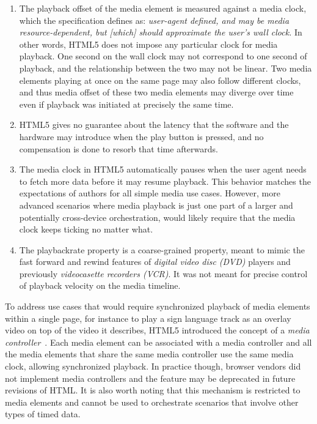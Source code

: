 \begin{enumerate}

\item{

The playback offset of the media element is measured against a media clock,
which the specification defines as: \emph{user-agent defined, and may be media
resource-dependent, but [which] should approximate the user's wall clock.} In
other words, HTML5 does not impose any particular clock for media playback.
One second on the wall clock may not correspond to one second of playback, and
the relationship between the two may not be linear. Two media elements playing
at once on the same page may also follow different clocks, and thus media
offset of these two media elements may diverge over time even if playback was
initiated at precisely the same time.

}

\item{

HTML5 gives no guarantee about the latency that the software and the hardware
may introduce when the play button is pressed, and no compensation is done to
resorb that time afterwards.

}

\item{

The media clock in HTML5 automatically pauses when the user agent needs to
fetch more data before it may resume playback. This behavior matches the
expectations of authors for all simple media use cases. However, more advanced
scenarios where media playback is just one part of a larger and potentially
cross-device orchestration, would likely require that the media clock keeps
ticking no matter what.

}

\item{

The playbackrate property is a coarse-grained property, meant to mimic the
fast forward and rewind features of \emph{digital video disc (DVD)} players
and previously \emph{videocasette recorders (VCR)}. It was not meant for
precise control of playback velocity on the media timeline.

}

\end{enumerate}

To address use cases that would require synchronized playback of media
elements within a single page, for instance to play a sign language track as
an overlay video on top of the video it describes, HTML5 introduced the
concept of a \emph{media controller}~\cite{mediacontroller}. Each media
element can be associated with a media controller and all the media elements
that share the same media controller use the same media clock, allowing
synchronized playback. In practice though, browser vendors did not implement
media controllers and the feature may be deprecated in future revisions of
HTML. It is also worth noting that this mechanism is restricted to media
elements and cannot be used to orchestrate scenarios that involve other types
of timed data.

